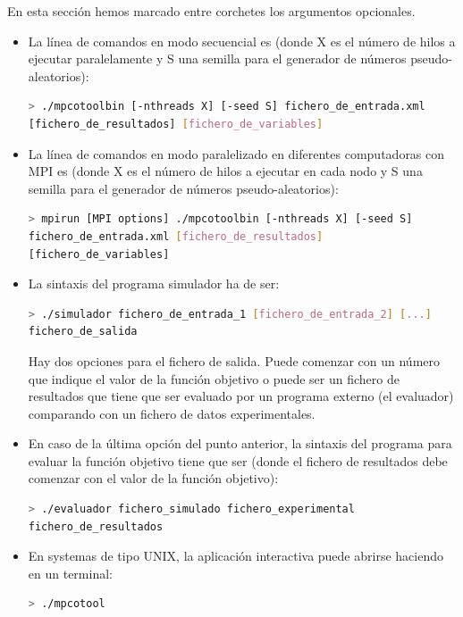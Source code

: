 \documentclass[a4paper]{report}
\begin{document}
En esta sección hemos marcado entre corchetes los argumentos opcionales.

\begin{itemize}

\item La línea de comandos en modo secuencial es (donde X es el número de hilos
a ejecutar paralelamente y S una semilla para el generador de números
pseudo-aleatorios):
\begin{lstlisting}[language=bash,basicstyle=\scriptsize]
> ./mpcotoolbin [-nthreads X] [-seed S] fichero_de_entrada.xml
[fichero_de_resultados] [fichero_de_variables]
\end{lstlisting}

\item La línea de comandos en modo paralelizado en diferentes computadoras con
MPI es (donde X es el número de hilos a ejecutar en cada nodo y S una semilla
para el generador de números pseudo-aleatorios):
\begin{lstlisting}[language=bash,basicstyle=\scriptsize]
> mpirun [MPI options] ./mpcotoolbin [-nthreads X] [-seed S] 
fichero_de_entrada.xml [fichero_de_resultados]
[fichero_de_variables]
\end{lstlisting}

\item La sintaxis del programa simulador ha de ser:
\begin{lstlisting}[language=bash,basicstyle=\scriptsize]
> ./simulador fichero_de_entrada_1 [fichero_de_entrada_2] [...]
fichero_de_salida
\end{lstlisting}
Hay dos opciones para el fichero de salida. Puede comenzar con un número que
indique el valor de la función objetivo o puede ser un fichero de resultados que
tiene que ser evaluado por un programa externo (el evaluador) comparando con un
fichero de datos experimentales.

\item En caso de la última opción del punto anterior, la sintaxis del programa
para evaluar la función objetivo tiene que ser (donde el fichero de resultados
debe comenzar con el valor de la función objetivo):
\begin{lstlisting}[language=bash,basicstyle=\scriptsize]
> ./evaluador fichero_simulado fichero_experimental
fichero_de_resultados
\end{lstlisting}

\item En systemas de tipo UNIX, la aplicación interactiva puede abrirse haciendo
en un terminal:
\begin{lstlisting}[language=bash,basicstyle=\scriptsize]
> ./mpcotool
\end{lstlisting}

\end{itemize}
\end{document}

